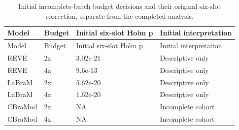 \begin{longtable}{llll}
\caption{Initial incomplete-batch budget decisions and their original six-slot correction, separate from the completed analysis.}\label{tab:budget_initial_decisions}\\
\toprule
Model & Budget & Initial six-slot Holm p & Initial interpretation \\
\midrule
\endfirsthead
\toprule
Model & Budget & Initial six-slot Holm p & Initial interpretation \\
\midrule
\endhead
REVE & 2x & 3.02e-21 & Descriptive only \\
REVE & 4x & 9.6e-13 & Descriptive only \\
LaBraM & 2x & 5.62e-20 & Descriptive only \\
LaBraM & 4x & 1.62e-20 & Descriptive only \\
CBraMod & 2x & NA & Incomplete cohort \\
CBraMod & 4x & NA & Incomplete cohort \\
\bottomrule
\end{longtable}
